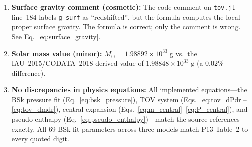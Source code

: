 \begin{enumerate}
  \item \textbf{Surface gravity comment (cosmetic):} The code comment on
    \texttt{tov.jl} line~184 labels \texttt{g\_surf} as
    ``redshifted'', but the formula computes the local proper surface
    gravity.  The formula is correct; only the comment is wrong.
    See Eq.~\eqref{eq:surface_gravity}.
  \item \textbf{Solar mass value (minor):} $M_{\odot}=1.98892\times
    10^{33}\;\text{g}$ vs.\ the IAU~2015/CODATA~2018 derived value of
    $1.98848\times10^{33}\;\text{g}$ (a $0.02\%$ difference).
  \item \textbf{No discrepancies in physics equations:} All implemented
    equations---the BSk pressure fit (Eq.~\ref{eq:bsk_pressure}),
    TOV system (Eqs.~\ref{eq:tov_dPdr}--\ref{eq:tov_dmdr}), central
    expansion (Eqs.~\ref{eq:m_central}--\ref{eq:P_central}), and
    pseudo-enthalpy (Eq.~\ref{eq:pseudo_enthalpy})---match the source
    references exactly.  All 69 BSk fit parameters across three models
    match P13 Table~2 to every quoted digit.
\end{enumerate}
